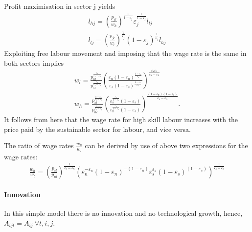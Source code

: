 Profit maximisation in sector j yields
\begin{align*}
l_{hj}= \left(\frac{p_{jl}}{w_h}\right)^{\frac{1}{1-\varepsilon_j}}\varepsilon_j^{\frac{1}{1-\varepsilon_j}}l_{lj}\\
l_{lj}= \left(\frac{p_{jl}}{w_l}\right)^\frac{1}{\varepsilon_j}(1-\varepsilon_j)^\frac{1}{\varepsilon_j}l_{hj}
\end{align*}
Exploiting free labour movement and imposing that the wage rate is the same in both sectors implies
\begin{align*}
 w_l= \frac{p_{nl}^\frac{\varepsilon_s}{\varepsilon_s-\varepsilon_n}}{p_{sl}^\frac{\varepsilon_n}{\varepsilon_s-\varepsilon_n}}\left(\frac{\varepsilon_n(1-\varepsilon_n)^\frac{1-\varepsilon_n}{\varepsilon_n}}{\varepsilon_s(1-\varepsilon_s)^\frac{1-\varepsilon_s}{\varepsilon_s}}\right)^\frac{\varepsilon_s\varepsilon_n}{\varepsilon_s-\varepsilon_n}\\
 w_h= \frac{p_{sl}^\frac{1-\varepsilon_n}{\varepsilon_s-\varepsilon_n}}{p_{nl}^\frac{1-\varepsilon_s}{\varepsilon_s-\varepsilon_n}}\left(\frac{\varepsilon_s^\frac{\varepsilon_s}{1-\varepsilon_s}(1-\varepsilon_s)}{\varepsilon_n^\frac{\varepsilon_n}{1-\varepsilon_s}(1-\varepsilon_s)}\right)^\frac{(1-\varepsilon_n)(1-\varepsilon_s)}{\varepsilon_s-\varepsilon_n}.
\end{align*}
It follows from here that the wage rate for high skill labour increases with the price paid by the sustainable sector for labour, and vice versa. 

The ratio of wage rates $\frac{w_h}{w_l}$ can be derived by use of above two expressions for the wage rates:
\begin{align}
\frac{w_h}{w_l}=\left(\frac{p_{sl}}{p_{nl}}\right)^\frac{1}{\varepsilon_s-\varepsilon_n}\left(\varepsilon_n^{-\varepsilon_n} (1-\varepsilon_n)^{-(1-\varepsilon_n)}\varepsilon_s^{\varepsilon_s} (1-\varepsilon_s)^{(1-\varepsilon_s)} \right)^\frac{1}{\varepsilon_s-\varepsilon_n}\label{eq:labourFirm_labrel}
\end{align}

\paragraph{Innovation}
In this simple model there is no innovation and no technological growth, hence, $A_{ijt}=A_{ij}\ \forall t, i, j$.


